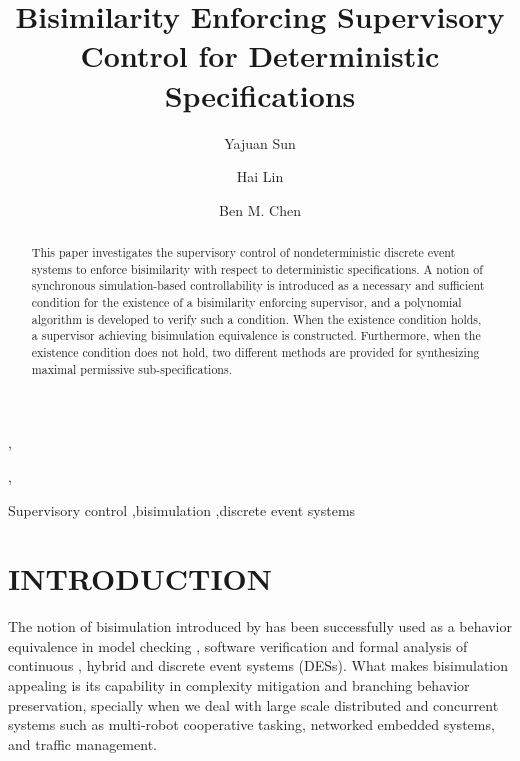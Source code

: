 \documentclass[preprint,authoryear,12pt]{elsarticle}
\begin{document}
\begin{frontmatter}
\thispagestyle{empty}



\title{Bisimilarity Enforcing Supervisory Control for Deterministic
Specifications }





\author[Singapore]{Yajuan Sun},    \author[USA]{Hai Lin},               \author[Singapore]{Ben M. Chen}  
\address[Singapore]{Dept. of Electrical and Computer Engineering, National University of Singapore, Singapore}  \address[USA]{Dept. of Electrical Engineering, University of
Notre Dame, USA}







\begin{abstract}

This paper investigates the supervisory control of
nondeterministic discrete event systems to enforce bisimilarity
with respect to deterministic specifications. A notion of
synchronous simulation-based controllability is introduced as a
necessary and sufficient condition for the existence of a
bisimilarity enforcing supervisor, and a polynomial algorithm is
developed to verify such a condition. When the existence condition
holds, a supervisor achieving bisimulation equivalence is
constructed. Furthermore, when the existence condition does not
hold, two different methods are provided for synthesizing maximal
permissive sub-specifications.
\end{abstract}


\newpage
\setcounter{page}{1}

\begin{keyword}
Supervisory control \sep bisimulation \sep discrete event systems

\end{keyword}

\end{frontmatter}


\label{}




\section{INTRODUCTION}
The notion of bisimulation introduced by
\cite{milner1989communication} has been successfully used as a
behavior equivalence in model checking \citep{clarke1997model},
software verification \citep{chaki2004abstraction} and formal
analysis of continuous \citep{tabuada2004bisimilar}, hybrid
\citep{tabuada2004compositional} and discrete event systems
(DESs). What makes bisimulation appealing is its capability in
complexity mitigation and branching behavior preservation,
specially when we deal with large scale distributed and concurrent
systems such as multi-robot cooperative tasking, networked
embedded systems, and traffic management.
\end{document}
